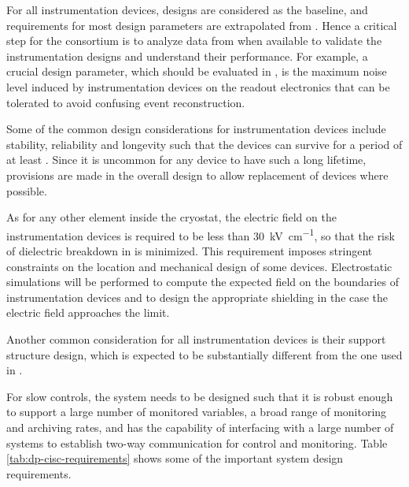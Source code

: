 
For all \lar instrumentation devices,  designs are
considered as the baseline, and requirements for most design
parameters are extrapolated from . Hence a critical step for
the  consortium is to analyze data from  when available
to validate the instrumentation designs and understand their
performance. For example, a crucial design parameter, which should be evaluated in ,
is the maximum noise level induced by instrumentation devices on the readout electronics that can be tolerated to avoid confusing event reconstruction. 

Some of the common design considerations for
instrumentation devices include stability, reliability and longevity
such that the devices can survive for a period of at least \dunelifetime{}.  Since it is uncommon for any device
to have such a long lifetime, provisions are made in the overall
design to allow replacement of devices where possible.

As for any other element inside the cryostat, 
the electric field on the instrumentation devices is 
required to be less than \SI{30}{kV\per\cm},
so that the risk of dielectric breakdown in  is minimized.
This requirement imposes stringent constraints on the location and mechanical 
design of some devices. Electrostatic simulations  
will be performed to compute the expected field on the boundaries of 
instrumentation devices and to design the appropriate \efield shielding
in the case the electric field approaches the limit. 

Another common consideration for all instrumentation devices is their support structure
design, which is expected to be substantially different from the one used in .

For slow controls, the system needs to be designed such that it is 
robust enough to support a large number of monitored variables, a broad range of
monitoring and archiving rates, and has the capability of interfacing 
with a large number of systems to establish two-way communication for
control and monitoring. Table \ref{tab:dp-cisc-requirements} shows
some of the important  system design requirements.

